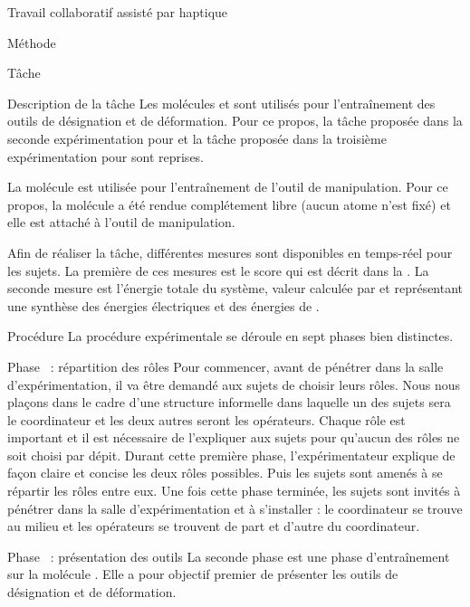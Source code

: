 \documentclass[myfrancais]{mythesis}
\begin{document}
\begin{mychapter}{Travail collaboratif assisté par haptique}
\begin{mysection}{Méthode}
\begin{mysubsection}{Tâche}
\begin{mysubsubsection}{Description de la tâche}
					Les molécules \myTRPCAGE et \myPrion sont utilisés pour l'entraînement des outils de désignation et de déformation.
					Pour ce propos, la tâche proposée dans la seconde expérimentation pour \myTRPCAGE et la tâche proposée dans la troisième expérimentation pour \myPrion sont reprises.

					La molécule \myTRPZIPPER est utilisée pour l'entraînement de l'outil de manipulation.
					Pour ce propos, la molécule \myTRPZIPPER a été rendue complétement libre (aucun atome n'est fixé) et elle est attaché à l'outil de manipulation.

					Afin de réaliser la tâche, différentes mesures sont disponibles en temps-réel pour les sujets.
					La première de ces mesures est le score  qui est décrit dans la .
					La seconde mesure est l'énergie totale du système, valeur calculée par  et représentant une synthèse des énergies électriques et des énergies de .
				\end{mysubsubsection}
			\end{mysubsection}
			\begin{mysubsection}{Procédure}
				La procédure expérimentale se déroule en sept phases bien distinctes.
				\begin{myparagraph}{Phase~ : répartition des rôles}
					Pour commencer, avant de pénétrer dans la salle d'expérimentation, il va être demandé aux sujets de choisir leurs rôles.
					Nous nous plaçons dans le cadre d'une structure informelle dans laquelle un des sujets sera le coordinateur et les deux autres seront les opérateurs.
					Chaque rôle est important et il est nécessaire de l'expliquer aux sujets pour qu'aucun des rôles ne soit choisi par dépit.
					Durant cette première phase, l'expérimentateur explique de façon claire et concise les deux rôles possibles.
					Puis les sujets sont amenés à se répartir les rôles entre eux.
					Une fois cette phase terminée, les sujets sont invités à pénétrer dans la salle d'expérimentation et à s'installer : le coordinateur se trouve au milieu et les opérateurs se trouvent de part et d'autre du coordinateur.
				\end{myparagraph}
				\begin{myparagraph}{Phase~ : présentation des outils}
					La seconde phase est une phase d'entraînement sur la molécule \myTRPCAGE.
					Elle a pour objectif premier de présenter les outils de désignation et de déformation.

\end{myparagraph}
\end{mysubsection}
\end{mysection}
\end{mychapter}
\end{document}
